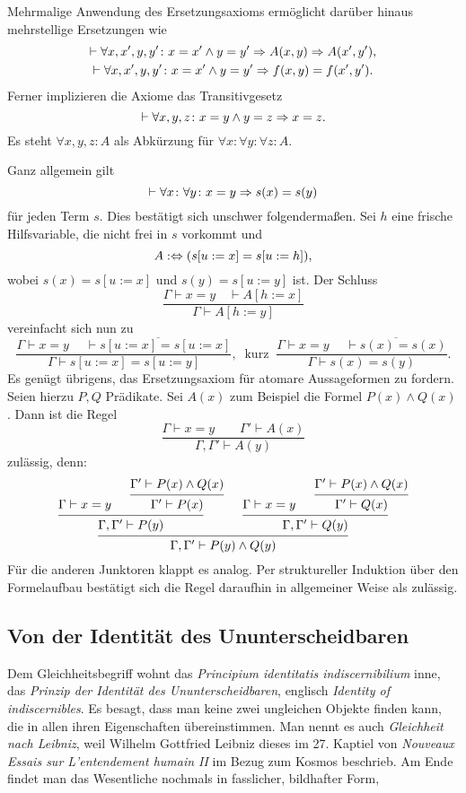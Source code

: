 Mehrmalige Anwendung des Ersetzungsaxioms ermöglicht darüber hinaus
mehrstellige Ersetzungen wie
\begin{gather*}
\vdash\forall x,x',y,y'\colon x=x'\land y=y'\Rightarrow A(x,y)\Rightarrow A(x',y'),\\
\vdash\forall x,x',y,y'\colon x=x'\land y=y'\Rightarrow f(x,y)=f(x',y').
\end{gather*}
Ferner implizieren die Axiome das Transitivgesetz
\[\vdash\forall x,y,z\colon x=y\land y=z\Rightarrow x=z.\]
Es steht $\forall x,y,z\colon A$ als Abkürzung für
$\forall x\colon\forall y\colon\forall z\colon A$.

Ganz allgemein gilt
\[\vdash\forall x\colon\forall y\colon x=y\Rightarrow s(x)=s(y)\]
für jeden Term $s$. Dies bestätigt sich unschwer folgendermaßen.
Sei $h$ eine frische Hilfsvariable, die nicht
frei in $s$ vorkommt und
\[A:\Leftrightarrow (s[u:=x]=s[u:=h]),\]
wobei $s(x)=s[u:=x]$ und $s(y)=s[u:=y]$ ist. Der Schluss
\[\dfrac{\Gamma\vdash x=y\quad\vdash A[h:=x]}{\Gamma\vdash A[h:=y]}\]
vereinfacht sich nun zu
\[\dfrac{\Gamma\vdash x=y\quad\;\overline{\vdash s[u:=x]=s[u:=x]}}{\Gamma\vdash s[u:=x]=s[u:=y]},
\;\;\text{kurz}\;\;\dfrac{\Gamma\vdash x=y\quad\;\overline{\vdash s(x)=s(x)}}{\Gamma\vdash s(x)=s(y)}.\]
Es genügt übrigens, das Ersetzungsaxiom für atomare Aussageformen zu fordern.
Seien hierzu $P,Q$ Prädikate. Sei $A(x)$ zum Beispiel die Formel $P(x)\land Q(x)$.
Dann ist die Regel
\[\dfrac{\Gamma\vdash x=y\qquad \Gamma'\vdash A(x)}{\Gamma,\Gamma'\vdash A(y)}\]
zulässig, denn:
\[\begin{prooftree}
    \hypo{\Gamma\vdash x=y}
      \hypo{\Gamma'\vdash P(x)\land Q(x)}
    \infer1{\Gamma'\vdash P(x)}
  \infer2{\Gamma,\Gamma'\vdash P(y)}
    \hypo{\Gamma\vdash x=y}
      \hypo{\Gamma'\vdash P(x)\land Q(x)}
    \infer1{\Gamma'\vdash Q(x)}
  \infer2{\Gamma,\Gamma'\vdash Q(y)}
\infer2{\Gamma,\Gamma'\vdash P(y)\land Q(y)}
\end{prooftree}\]
Für die anderen Junktoren klappt es analog. Per struktureller Induktion
über den Formelaufbau bestätigt sich die Regel daraufhin in allgemeiner
Weise als zulässig.

\subsection{Von der Identität des Ununterscheidbaren}

Dem Gleichheitsbegriff wohnt das \emph{Principium
identitatis indiscernibilium} inne, das \emph{Prinzip der Identität des
Ununterscheidbaren}, englisch \emph{Identity of indiscernibles}.
Es besagt, dass man keine zwei ungleichen Objekte finden kann,
die in allen ihren Eigenschaften übereinstimmen. Man nennt es auch
\emph{Gleichheit nach Leibniz}, weil Wilhelm Gottfried
Leibniz dieses im 27. Kaptiel von
\emph{Nouveaux Essais sur L'entendement humain II}
im Bezug zum Kosmos beschrieb. Am Ende findet man das Wesentliche
nochmals in fasslicher, bildhafter Form,

